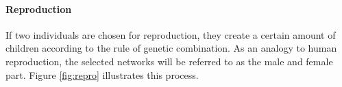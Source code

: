 \documentclass[10pt,a4paper,DIV=11]{scrreprt}
\begin{document}

\paragraph{Reproduction}
If two individuals are chosen for reproduction, they create a certain amount of children according to the rule of genetic combination. 
As an analogy to human reproduction, the selected networks will be referred to as the male and female part. Figure \ref{fig:repro} illustrates 
this process. 
\end{document}
